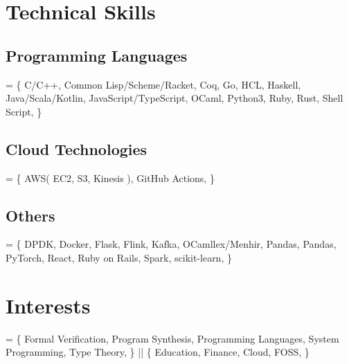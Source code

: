 \documentclass[10pt]{article}
\begin{document}
\section*{Technical Skills}
  \subsection*{Programming Languages}
    = \{
      C/C++,
      Common Lisp/Scheme/Racket,
      Coq,
      Go,
      HCL,
      Haskell,
      Java/Scala/Kotlin,
      JavaScript/TypeScript,
      OCaml,
      Python3,
      Ruby,
      Rust,
      Shell Script,
    \}
  \subsection*{Cloud Technologies}
    = \{
      AWS(
        EC2,
        S3,
        Kinesis
      ),
      GitHub Actions,
    \}
  \subsection*{Others}
    = \{
      DPDK,
      Docker,
      Flask,
      Flink,
      Kafka,
      OCamllex/Menhir,
      Pandas,
      Pandas,
      PyTorch,
      React,
      Ruby on Rails,
      Spark,
      scikit-learn,
    \}

\section*{Interests}
  = \{
    Formal Verification,
    Program Synthesis,
    Programming Languages,
    System Programming,
    Type Theory,
  \}
  ||
  \{
    Education,
    Finance,
    Cloud,
    FOSS,
  \}
\end{document}

